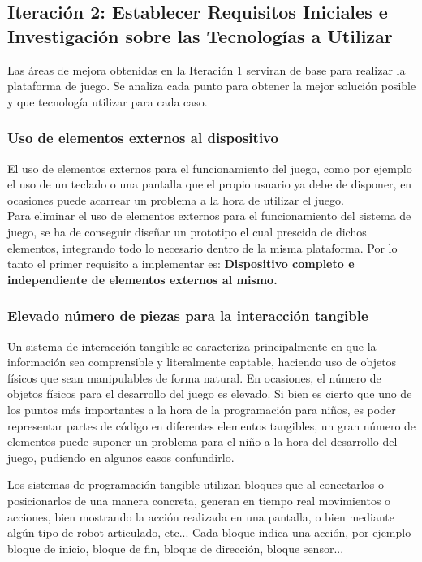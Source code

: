 \subsection{Iteración 2: Establecer Requisitos Iniciales e Investigación sobre las Tecnologías a Utilizar}

Las áreas de mejora obtenidas en la Iteración 1 serviran de base para realizar la plataforma de juego. Se analiza cada punto para obtener la mejor solución posible y que tecnología utilizar para cada caso.

\subsubsection{Uso de elementos externos al dispositivo}
El uso de elementos externos para el funcionamiento del juego, como por ejemplo el uso de un teclado o una pantalla que el propio usuario ya debe de disponer, en ocasiones puede acarrear un problema a la hora de utilizar el juego.\\ 
Para eliminar el uso de elementos externos para el funcionamiento del sistema de juego, se ha de conseguir diseñar un prototipo el cual prescida de dichos elementos, integrando todo lo necesario dentro de la misma plataforma. Por lo tanto el primer requisito a implementar es: \textbf{Dispositivo completo e independiente de elementos externos al mismo.}

\subsubsection{Elevado número de piezas para la interacción tangible}
Un sistema de interacción tangible se caracteriza principalmente en que la información sea comprensible y literalmente captable, haciendo uso de objetos físicos que sean manipulables de forma natural. En ocasiones, el número de objetos físicos para el desarrollo del juego es elevado. Si bien es cierto que uno de los puntos más importantes a la hora de la programación para niños, es poder representar partes de código en diferentes elementos tangibles, un gran número de elementos puede suponer un problema para el niño a la hora del desarrollo del juego, pudiendo en algunos casos confundirlo. 

Los sistemas de programación tangible utilizan bloques que al conectarlos o posicionarlos de una manera concreta, generan en tiempo real movimientos o acciones, bien mostrando la acción realizada en una pantalla, o bien mediante algún tipo de robot articulado, etc... Cada bloque indica una acción, por ejemplo bloque de inicio, bloque de fin, bloque de dirección, bloque sensor... 


